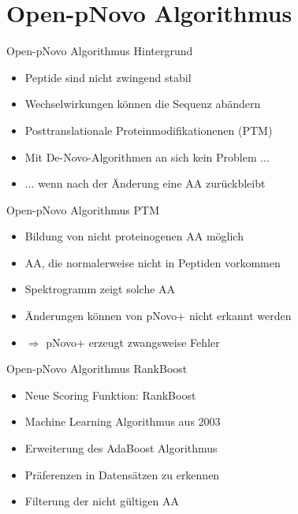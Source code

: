 \documentclass{beamer}
\newcommand{\dashAndSpace}{\textendash \space}
\begin{document}
    \section{Open-pNovo Algorithmus}
    \begin{frame}{Open-pNovo Algorithmus \dashAndSpace Hintergrund}
        \begin{itemize}
            \item<1-> Peptide sind nicht zwingend stabil
            \item<1-> Wechselwirkungen können die Sequenz abändern
            \item<1-> Posttranslationale Proteinmodifikationenen (PTM)
            \item<2-> Mit De-Novo-Algorithmen an sich kein Problem ...
            \item<3-> ... wenn nach der Änderung eine AA zurückbleibt
        \end{itemize}
    \end{frame}

    \begin{frame}{Open-pNovo Algorithmus \dashAndSpace PTM}
        \begin{itemize}
            \item<1-> Bildung von nicht proteinogenen AA möglich
            \item<1-> AA, die normalerweise nicht in Peptiden vorkommen
            \item<2-> Spektrogramm zeigt solche AA
            \item<2-> Änderungen können von pNovo+ nicht erkannt werden
        \end{itemize}
        \begin{itemize}
            \item<3-> $\Rightarrow$ pNovo+ erzeugt zwangsweise Fehler
        \end{itemize}
    \end{frame}

    \begin{frame}{Open-pNovo Algorithmus \dashAndSpace RankBoost}
        \begin{itemize}
            \item<1-> Neue Scoring Funktion: RankBoost
            \item<1-> Machine Learning Algorithmus aus 2003
            \item<1-> Erweiterung des AdaBoost Algorithmus
            \item<1-> Präferenzen in Datensätzen zu erkennen
        \end{itemize}
        \begin{itemize}
            \item<2-> Filterung der nicht gültigen AA
        \end{itemize}
    \end{frame}
\end{document}
